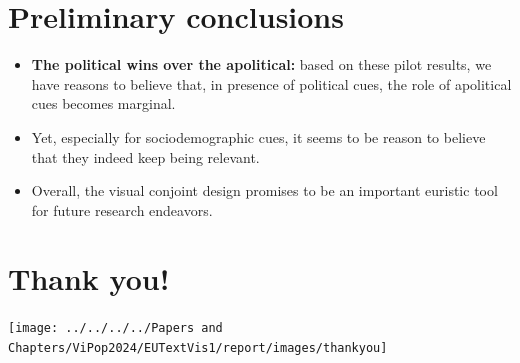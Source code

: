 \documentclass[
]{article}
\begin{document}
\section{Preliminary conclusions}\label{preliminary-conclusions}

\begin{itemize}
\item
  \textbf{The political wins over the apolitical:} based on these pilot
  results, we have reasons to believe that, in presence of political
  cues, the role of apolitical cues becomes marginal.
\item
  Yet, especially for sociodemographic cues, it seems to be reason to
  believe that they indeed keep being relevant.
\item
  Overall, the visual conjoint design promises to be an important
  euristic tool for future research endeavors.
\end{itemize}

\section{Thank you!}\label{thank-you}

\begin{center}\texttt{[image: ../../../../Papers and Chapters/ViPop2024/EUTextVis1/report/images/thankyou]} \end{center}
\end{document}
